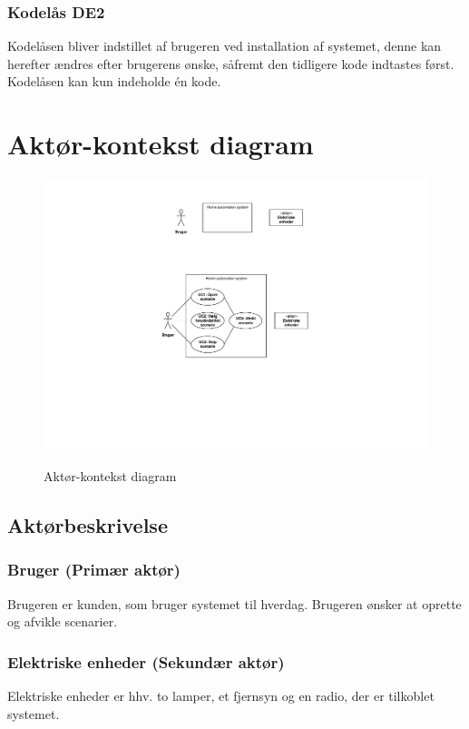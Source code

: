 \subsubsection{Kodelås DE2}
Kodelåsen bliver indstillet af brugeren ved installation af systemet, denne kan herefter ændres efter brugerens ønske, såfremt den tidligere kode indtastes først.
Kodelåsen kan kun indeholde én kode.

\clearpage
\section{Aktør-kontekst diagram}
\begin{figure}[h]
\centering
\includegraphics[scale=1,clip=true,trim=250 475 250 50]{../Kravspecifikation/actor.pdf}
\label{fig:actor}
\caption{Aktør-kontekst diagram}
\end{figure}

\subsection{Aktørbeskrivelse}
\subsubsection{Bruger (Primær aktør)}
Brugeren er kunden, som bruger systemet til hverdag. Brugeren ønsker at oprette og afvikle scenarier.

\subsubsection{Elektriske enheder (Sekundær aktør)}
Elektriske enheder er hhv. to lamper, et fjernsyn og en radio, der er tilkoblet systemet.

